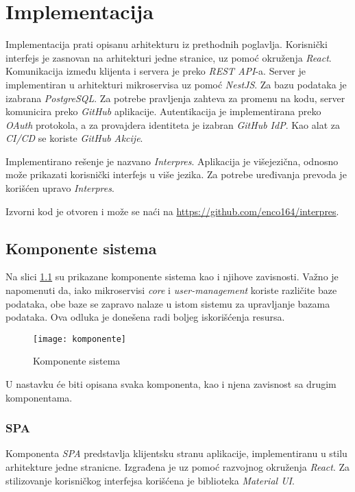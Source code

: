 \chapter{Implementacija}\label{ch:impl}

Implementacija prati opisanu arhitekturu iz prethodnih poglavlja. 
Korisnički interfejs je zasnovan na arhitekturi jedne stranice, 
uz pomoć okruženja \textit{React}. Komunikacija između klijenta i servera 
je preko \textit{REST API}-a. Server je implementiran u arhitekturi
mikroservisa uz pomoć \textit{NestJS}. Za bazu podataka 
je izabrana \textit{PostgreSQL}. Za potrebe pravljenja zahteva za promenu 
na kodu, server komunicira preko \textit{GitHub} aplikacije. Autentikacija 
je implementirana preko \textit{OAuth} protokola, a za provajdera 
identiteta je izabran \textit{GitHub IdP}. Kao alat za \textit{CI/CD} se koriste 
\textit{GitHub Akcije}. 

Implementirano rešenje je nazvano \textit{Interpres}. Aplikacija je 
višejezična, odnosno može prikazati korisnički interfejs u više 
jezika. Za potrebe uređivanja prevoda je korišćen upravo \textit{Interpres}.

Izvorni kod je otvoren i može se naći na \url{https://github.com/enco164/interpres}.


\section{Komponente sistema}

Na slici \ref{fig:komponente} su prikazane komponente sistema kao i
njihove zavisnosti. Važno je napomenuti da, iako mikroservisi \textit{core} i 
\textit{user-management} koriste različite baze podataka,
obe baze se zapravo nalaze u istom sistemu za upravljanje bazama podataka. 
Ova odluka je donešena radi boljeg iskorišćenja resursa. 

\begin{figure}[h]
  \centering
  \texttt{[image: komponente]}
  \caption{Komponente sistema}
  \label{fig:komponente}
\end{figure}

U nastavku će biti opisana svaka komponenta, kao i njena 
zavisnost sa drugim komponentama.

\subsection{SPA}
Komponenta \textit{SPA} predstavlja klijentsku stranu aplikacije, implementiranu 
u stilu arhitekture jedne stranicne. Izgrađena je 
uz pomoć razvojnog okruženja \textit{React}. Za stilizovanje korisničkog 
interfejsa korišćena je biblioteka \textit{Material UI}. 

